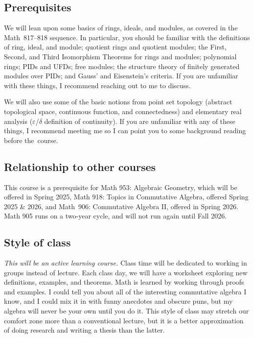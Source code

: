 \documentclass[12pt]{amsart}
\begin{document}
	\subsection*{Prerequisites} We will lean upon some basics of rings, ideals, and modules, as covered in the \mbox{Math 817--818} sequence. In particular, you should be familiar with the definitions of ring, ideal, and module; quotient rings and quotient modules; the First, Second, and Third Isomorphism Theorems for rings and modules; polynomial rings; PIDs and UFDs; free modules; the structure theory of finitely generated modules over PIDs; and Gauss' and Eisenstein's criteria. If you are unfamiliar with these things, I recommend reaching out to me to discuss.
	
	We will also use some of the basic notions from point set topology (abstract topological space, continuous function, and connectedness) and elementary real analysis ($\varepsilon$/$\delta$ definition of continuity). If you are unfamiliar with any of these things, I recommend meeting me so I can point you to some background reading before the~course.
	

	
	\subsection*{Relationship to other courses} This course is a prerequisite for Math 953: Algebraic Geometry, which will be offered in Spring 2025, Math 918: Topics in Commutative Algebra, offered Spring 2025 \& 2026, and Math~906: Commutative Algebra II, offered in Spring 2026. Math 905 runs on a two-year cycle, and will not run again until Fall 2026.
	
	\subsection*{Style of class} \emph{This will be an active learning course.} Class time will be dedicated to working in groups instead of lecture. Each class day, we will have a worksheet exploring new definitions, examples, and theorems. Math is learned by working through proofs and examples. I could tell you about all of the interesting commutative algebra I know, and I could mix it in with funny anecdotes and obscure puns, but my algebra will never be your own until you do it. This style of class may stretch our comfort zone more than a conventional lecture, but it is a better approximation of doing research and writing a thesis than the latter.
			
\end{document}
